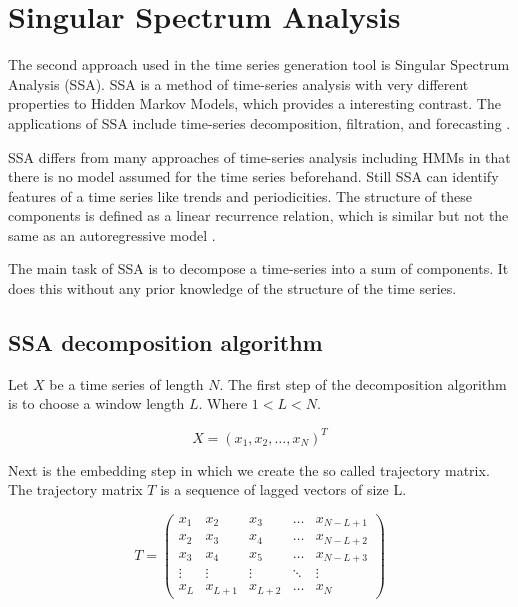 
\chapter{Singular Spectrum Analysis}\label{chapter:ssa}

The second approach used in the time series generation tool is Singular Spectrum Analysis (SSA). SSA is a method of time-series analysis with very different properties to Hidden Markov Models, which provides a interesting contrast. The applications of SSA include time-series decomposition, filtration, and forecasting \parencite{golyandina2013singular}.

SSA differs from many approaches of time-series analysis including HMMs in that there is no model assumed for the time series beforehand. Still SSA can identify features of a time series like trends and periodicities. The structure of these components is defined as a linear recurrence relation, which is similar but not the same as an autoregressive model \parencite{golyandina2014basic}.

The main task of SSA is to decompose a time-series into a sum of components. It does this without any prior knowledge of the structure of the time series. 

\section{SSA decomposition algorithm}

Let $X$ be a time series of length $N$. The first step of the decomposition algorithm is to choose a window length $L$. Where $1 < L < N$. 

\begin{equation}
   X = (x_1, x_2, \ldots ,x_N)^T
\end{equation}

Next is the embedding step in which we create the so called trajectory matrix. The trajectory matrix $T$ is a sequence of lagged vectors of size L. 

\begin{equation}
   T = 
\left(\begin{array}{ccccc}
x_{1} & x_{2} & x_{3} & \dots & x_{N-L+1} \\
x_{2} & x_{3} & x_{4} & \dots & x_{N-L+2} \\
x_{3} & x_{4} & x_{5} & \dots & x_{N-L+3} \\
\vdots & \vdots & \vdots & \ddots & \vdots \\
x_{L} & x_{L+1} & x_{L+2} & \dots & x_{N}
\end{array}\right)
   \label{eq:ssa-trajectory}
\end{equation}

